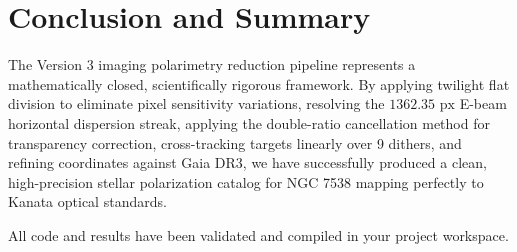 \documentclass[11pt,a4paper]{article}
\begin{document}
\newpage
\section{Conclusion and Summary}
The Version 3 imaging polarimetry reduction pipeline represents a mathematically closed, scientifically rigorous framework. By applying twilight flat division to eliminate pixel sensitivity variations, resolving the $1362.35\text{ px}$ E-beam horizontal dispersion streak, applying the double-ratio cancellation method for transparency correction, cross-tracking targets linearly over 9 dithers, and refining coordinates against Gaia DR3, we have successfully produced a clean, high-precision stellar polarization catalog for NGC 7538 mapping perfectly to Kanata optical standards.

All code and results have been validated and compiled in your project workspace.
\end{document}
